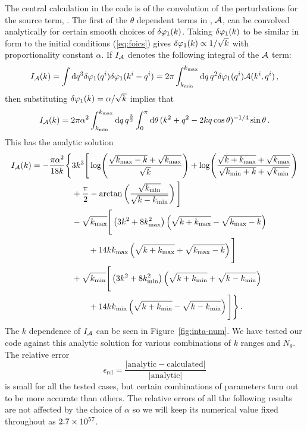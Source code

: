The central calculation in the code is of the
convolution of the perturbations for the source term,
. The first of the $\theta$ dependent terms in
, $\mathcal{A}$,
can be convolved analytically for certain smooth choices of $\delta\varphi_{1}(k)$. 
Taking $\delta\varphi_{1}(k)$ to be similar in form to the initial conditions
(\ref{eq:foics}) gives $\delta\varphi_{1}(k)\propto 1/\sqrt{k}$ with proportionality constant
$\alpha$.
If $I_{\mathcal{A}}$ denotes the following integral of the $\mathcal{A}$ term:
% 
\begin{equation}
 I_{\mathcal{A}} (k) = \int \mathrm{d} q^3 \delta\varphi_{1}(q^i) \delta\varphi_{1}(k^i-q^i) 
          = 2\pi \int_{k_{\mathrm{min}}}^{k_{\mathrm{max}}} \mathrm{d} q\, q^2 \delta\varphi_{1}(q^i) \mathcal{A}(k^i, q^i)\,,
\end{equation}
% 
then substituting $\delta\varphi_{1}(k) = \alpha/\sqrt{k}$ implies that
% 
\begin{equation}
 I_{\mathcal{A}}(k) = 2\pi\alpha^2 \int_{k_{\mathrm{min}}}^{k_{\mathrm{max}}} \mathrm{d} q\, q^{\frac{3}{2}}
\int_{0}^{\pi} \mathrm{d}\theta\, (k^2 + q^2 -2k q \cos{\theta})^{-1/4} \sin{\theta}\,. 
\end{equation}
% 
This has the analytic solution
% 
\begin{align}
\label{eq:err-analytic-num}
 I_\A(k) = -\frac{\pi\alpha^2}{18 k}\Bigg\{ 
	&3 k^3 \Bigg[ \log\Biggl(\frac{\sqrt{\kmax-k} + \sqrt{\kmax}}{\sqrt{k}}
			    \Biggr)
	 + \log\Biggl( \frac{\sqrt{k+\kmax} +\sqrt{\kmax}}{\sqrt{\kmin+k} +
		      \sqrt{\kmin}}\Biggr) \nonumber \\
	&+\frac{\pi}{2} - \arctan\left( \frac{\sqrt{\kmin}}{\sqrt{k-\kmin}}\right)
	\Bigg] \nonumber\\
% 
        &-\sqrt{\kmax}\Bigg[ \left(3k^2 + 8\kmax^2 \right)\left(\sqrt{k+\kmax} -
	  \sqrt{\kmax-k}\right) \nonumber \\
	&\qquad + 14k\kmax\left(\sqrt{k+\kmax}+\sqrt{\kmax-k}\right)\Bigg]\nonumber\\
% 
	&+\sqrt{\kmin}\Bigg[ \left(3k^2 + 8\kmin^2 \right)\left(\sqrt{k+\kmin} +
	  \sqrt{k-\kmin}\right) \nonumber \\
	&\qquad +14k\kmin \left(\sqrt{k+\kmin} -
         \sqrt{k-\kmin} \right) \Bigg] \Bigg\} \,.
\end{align}
% 
% 
% 
The $k$ dependence of $I_{\mathcal{A}}$ can be seen in Figure~\ref{fig:inta-num}. 
We have tested our code against this analytic solution for various
combinations of $k$ ranges and $N_\theta$. The relative error
%
\begin{equation}
 \epsilon_\mathrm{rel} = \frac{|\mathrm{analytic}- \mathrm{calculated}
|}{|\mathrm{analytic}|}
\end{equation}
%
is small for all the tested cases, but certain combinations of
parameters turn out to be more accurate than others. The relative errors of
all the following results are not affected by the choice of $\alpha$ so
we will keep its numerical value fixed throughout as $2.7\times 10^{57}$.

